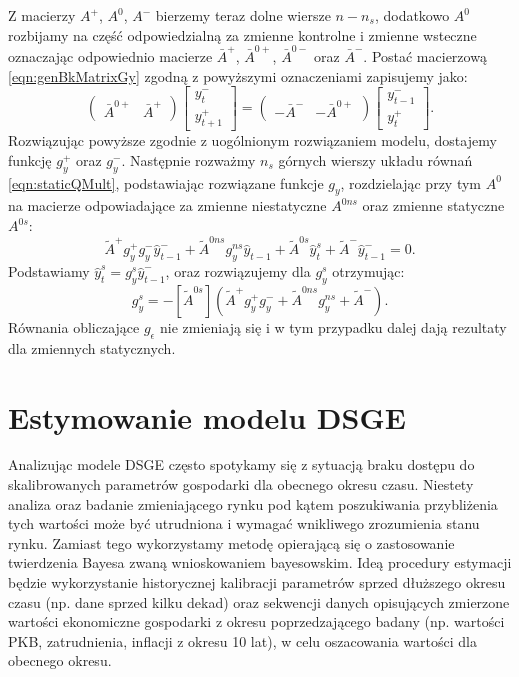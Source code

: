 Z macierzy $A^+$, $A^0$, $A^-$ bierzemy teraz dolne wiersze $n - n_s$, dodatkowo $A^0$ rozbijamy na część odpowiedzialną za zmienne kontrolne i zmienne wsteczne oznaczając odpowiednio macierze $\bar{A}^+$, $\bar{A}^{0+}$, $\bar{A}^{0-}$ oraz $\bar{A}^{-}$. Postać macierzową \eqref{eqn:genBkMatrixGy} zgodną z powyższymi oznaczeniami zapisujemy jako:
\begin{equation}
    \begin{pmatrix}
        \bar{A}^{0+} & \bar{A}^+
    \end{pmatrix}
    \begin{bmatrix}
        y_t^- \\
        y_{t+1}^+
    \end{bmatrix} = 
        \begin{pmatrix}
        -\bar{A}^{-} & -\bar{A}^{0+}
    \end{pmatrix}
    \begin{bmatrix}
        y_{t-1}^- \\
        y_{t}^+
    \end{bmatrix}.
\end{equation}
Rozwiązując powyższe zgodnie z uogólnionym rozwiązaniem modelu, dostajemy funkcję $g_y^+$ oraz $g_y^-$. Następnie rozważmy $n_s$ górnych wierszy układu równań \eqref{eqn:staticQMult}, podstawiając rozwiązane funkcje $g_y$, rozdzielając przy tym $A^0$ na macierze odpowiadające za zmienne niestatyczne $A^{0ns}$ oraz zmienne statyczne $A^{0s}$:
\begin{equation}
    \widetilde{A}^+ g_y^+ g_y^- \hat{y}^-_{t-1} + \widetilde{A}^{0ns} g_y^{ns}\hat{y}_{t-1} + \widetilde{A}^{0s} \hat{y}_t^s + \widetilde{A}^- \hat{y}^-_{t-1} = 0.
\end{equation}
Podstawiamy $\hat{y}_t^s = g_y^s \hat{y}^-_{t-1}$, oraz rozwiązujemy dla $g_y^s$ otrzymując:
\begin{equation}
    g_y^s = - [\widetilde{A}^{0s}](\widetilde{A}^+ g_y^+ g_y^- + \widetilde{A}^{0ns} g_y^{ns} + \widetilde{A}^-).
\end{equation}
Równania obliczające $g_\epsilon$ nie zmieniają się i w tym przypadku dalej dają rezultaty dla zmiennych statycznych.

\section{Estymowanie modelu DSGE}
\label{sec:estimate_bayes_dsge}

Analizując modele DSGE często spotykamy się z sytuacją braku dostępu do skalibrowanych parametrów gospodarki dla obecnego okresu czasu. Niestety analiza oraz badanie zmieniającego rynku pod kątem poszukiwania przybliżenia tych wartości może być utrudniona i wymagać wnikliwego zrozumienia stanu rynku. Zamiast tego wykorzystamy metodę opierającą się o zastosowanie twierdzenia Bayesa zwaną wnioskowaniem bayesowskim. Ideą procedury estymacji będzie wykorzystanie historycznej kalibracji parametrów sprzed dłuższego okresu czasu (np. dane sprzed kilku dekad) oraz sekwencji danych opisujących zmierzone wartości ekonomiczne gospodarki z okresu poprzedzającego badany (np. wartości PKB, zatrudnienia, inflacji z okresu 10 lat), w celu oszacowania wartości dla obecnego okresu.


